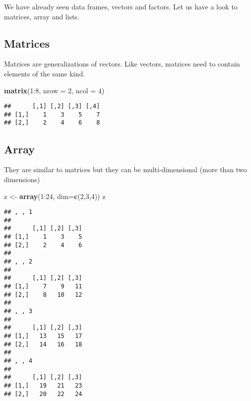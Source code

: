 \documentclass[]{book}
\newenvironment{Shaded}{\begin{snugshade}}{\end{snugshade}}
\newcommand{\KeywordTok}[1]{\textcolor[rgb]{0.13,0.29,0.53}{\textbf{{#1}}}}
\newcommand{\DataTypeTok}[1]{\textcolor[rgb]{0.13,0.29,0.53}{{#1}}}
\newcommand{\DecValTok}[1]{\textcolor[rgb]{0.00,0.00,0.81}{{#1}}}
\newcommand{\StringTok}[1]{\textcolor[rgb]{0.31,0.60,0.02}{{#1}}}
\newcommand{\NormalTok}[1]{{#1}}
\begin{document}
We have already seen data frames, vectors and factors. Let us have a
look to matrices, array and lists.

\subsection{Matrices}\label{matrices}

Matrices are generalizations of vectors. Like vectors, matrices need to
contain elements of the same kind.

\begin{Shaded}
\begin{Highlighting}[]
\KeywordTok{matrix}\NormalTok{(}\DecValTok{1}\NormalTok{:}\DecValTok{8}\NormalTok{, }\DataTypeTok{nrow =} \DecValTok{2}\NormalTok{, }\DataTypeTok{ncol =} \DecValTok{4}\NormalTok{)}
\end{Highlighting}
\end{Shaded}

\begin{verbatim}
##      [,1] [,2] [,3] [,4]
## [1,]    1    3    5    7
## [2,]    2    4    6    8
\end{verbatim}

\subsection{Array}\label{array}

They are similar to matrices but they can be multi-dimensional (more
than two dimensions)

\begin{Shaded}
\begin{Highlighting}[]
\NormalTok{z <-}\StringTok{ }\KeywordTok{array}\NormalTok{(}\DecValTok{1}\NormalTok{:}\DecValTok{24}\NormalTok{, }\DataTypeTok{dim=}\KeywordTok{c}\NormalTok{(}\DecValTok{2}\NormalTok{,}\DecValTok{3}\NormalTok{,}\DecValTok{4}\NormalTok{))}
\NormalTok{z}
\end{Highlighting}
\end{Shaded}

\begin{verbatim}
## , , 1
## 
##      [,1] [,2] [,3]
## [1,]    1    3    5
## [2,]    2    4    6
## 
## , , 2
## 
##      [,1] [,2] [,3]
## [1,]    7    9   11
## [2,]    8   10   12
## 
## , , 3
## 
##      [,1] [,2] [,3]
## [1,]   13   15   17
## [2,]   14   16   18
## 
## , , 4
## 
##      [,1] [,2] [,3]
## [1,]   19   21   23
## [2,]   20   22   24
\end{verbatim}
\end{document}
